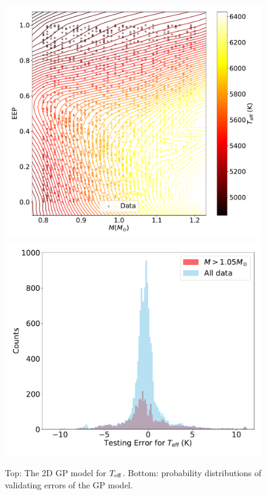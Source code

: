 \begin{figure}
	\includegraphics[width=1.0\columnwidth]{2d_GPmodel_function.pdf}
	\includegraphics[width=1.0\columnwidth]{2d_testing_hist_effective_T.pdf}	
    \caption{Top: The 2D GP model for $T_{\rm eff}$. Bottom: probability distributions of validating errors of the GP model. }  
    \label{fig:2dtest}
\end{figure}

